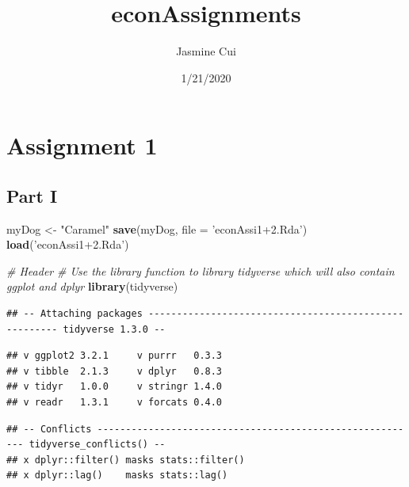 \documentclass[]{article}
\title{econAssignments}
\author{Jasmine Cui}
\date{1/21/2020}
\newenvironment{Shaded}{\begin{snugshade}}{\end{snugshade}}
\newcommand{\KeywordTok}[1]{\textcolor[rgb]{0.13,0.29,0.53}{\textbf{#1}}}
\newcommand{\DataTypeTok}[1]{\textcolor[rgb]{0.13,0.29,0.53}{#1}}
\newcommand{\StringTok}[1]{\textcolor[rgb]{0.31,0.60,0.02}{#1}}
\newcommand{\CommentTok}[1]{\textcolor[rgb]{0.56,0.35,0.01}{\textit{#1}}}
\newcommand{\NormalTok}[1]{#1}
\begin{document}
\maketitle

\section{Assignment 1}\label{assignment-1}

\subsection{Part I}\label{part-i}

\begin{Shaded}
\begin{Highlighting}[]
\NormalTok{myDog <-}\StringTok{ "Caramel"}
\KeywordTok{save}\NormalTok{(myDog, }\DataTypeTok{file =} \StringTok{'econAssi1+2.Rda'}\NormalTok{)}
\KeywordTok{load}\NormalTok{(}\StringTok{'econAssi1+2.Rda'}\NormalTok{)}
\end{Highlighting}
\end{Shaded}

\begin{Shaded}
\begin{Highlighting}[]
\CommentTok{# Header}
\CommentTok{# Use the library function to library tidyverse which will also contain ggplot and dplyr}
\KeywordTok{library}\NormalTok{(tidyverse)}
\end{Highlighting}
\end{Shaded}

\begin{verbatim}
## -- Attaching packages ------------------------------------------------------ tidyverse 1.3.0 --
\end{verbatim}

\begin{verbatim}
## v ggplot2 3.2.1     v purrr   0.3.3
## v tibble  2.1.3     v dplyr   0.8.3
## v tidyr   1.0.0     v stringr 1.4.0
## v readr   1.3.1     v forcats 0.4.0
\end{verbatim}

\begin{verbatim}
## -- Conflicts --------------------------------------------------------- tidyverse_conflicts() --
## x dplyr::filter() masks stats::filter()
## x dplyr::lag()    masks stats::lag()
\end{verbatim}
\end{document}

